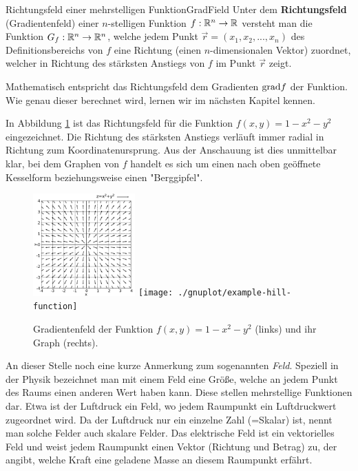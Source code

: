 \begin{definition}{Richtungsfeld einer mehrstelligen Funktion}{GradField}
    Unter dem \textbf{Richtungsfeld} (Gradientenfeld) einer $n$-stelligen Funktion $f: \mathbb{R}^n \to  \mathbb{R}$ versteht man die Funktion $G_f: \mathbb{R}^n \to \mathbb{R}^n$, welche jedem Punkt $\vec{r}=(x_1,x_2,...,x_n)$ des Definitionsbereichs von $f$ eine Richtung (einen $n$-dimensionalen Vektor) zuordnet, welcher in Richtung des stärksten Anstiegs von $f$ im Punkt $\vec{r}$ zeigt.
\end{definition}

Mathematisch entspricht das Richtungsfeld dem Gradienten $\text{grad}{f}$ der Funktion. Wie genau dieser berechnet wird, lernen wir im nächsten Kapitel kennen. 

In Abbildung \ref{fig:ExGradField} ist das Richtungsfeld für die Funktion $f(x,y) = 1-x^2-y^2$ eingezeichnet. Die Richtung des stärksten Anstiegs verläuft immer radial in Richtung zum Koordinatenursprung. Aus der Anschauung ist dies unmittelbar klar, bei dem Graphen von $f$ handelt es sich um einen nach oben geöffnete Kesselform beziehungsweise einen "Berggipfel".

\begin{figure}
    \centering
    \includegraphics[width=0.35\textwidth]{./gnuplot/example-gradient-field}
    \texttt{[image: ./gnuplot/example-hill-function]}
    \caption[Gradientenfeld einer zweistelligen Funktion]{Gradientenfeld der Funktion $f(x,y) = 1-x^2-y^2$ (links) und ihr Graph (rechts).}
    \label{fig:ExGradField}
\end{figure}

An dieser Stelle noch eine kurze Anmerkung zum sogenannten \emph{Feld}. Speziell in der Physik bezeichnet man mit einem Feld eine Größe, welche an jedem Punkt des Raums einen anderen Wert haben kann. Diese stellen mehrstellige Funktionen dar. Etwa ist der Luftdruck ein Feld, wo jedem Raumpunkt ein Luftdruckwert zugeordnet wird. Da der Luftdruck nur ein einzelne Zahl (=Skalar) ist, nennt man solche Felder auch skalare Felder. Das elektrische Feld ist ein vektorielles Feld und weist jedem Raumpunkt einen Vektor (Richtung und Betrag) zu, der angibt, welche Kraft eine geladene Masse an diesem Raumpunkt erfährt.

